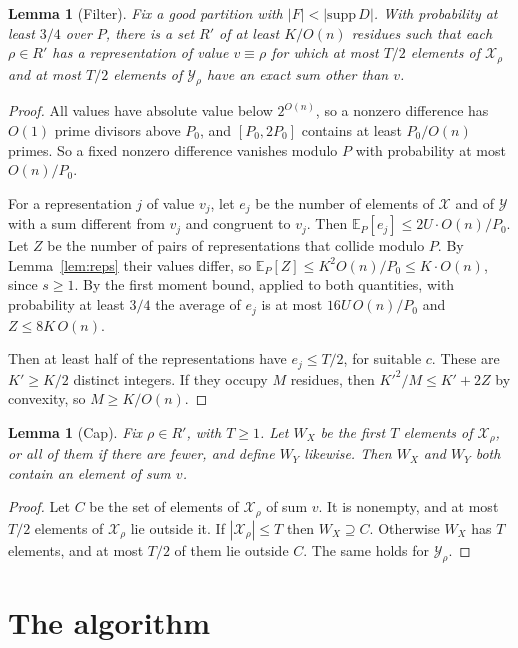 \documentclass[11pt]{article}
\newtheorem{lemma}[theorem]{Lemma}
\theoremstyle{remark}
\newcommand{\Xs}{\mathcal X}
\newcommand{\Ys}{\mathcal Y}
\begin{document}
\begin{lemma}[Filter]\label{lem:filter}
Fix a good partition with $|F|<|\mathrm{supp}\,D|$. With probability at least $3/4$ over $P$, there is a set $R'$ of at least $K/O(n)$ residues such that each $\rho\in R'$ has a representation of value $v\equiv\rho$ for which at most $T/2$ elements of $\Xs_\rho$ and at most $T/2$ elements of $\Ys_\rho$ have an exact sum other than $v$.
\end{lemma}
\begin{proof}
All values have absolute value below $2^{O(n)}$, so a nonzero difference has $O(1)$ prime divisors above $P_0$, and $[P_0,2P_0]$ contains at least $P_0/O(n)$ primes. So a fixed nonzero difference vanishes modulo $P$ with probability at most $O(n)/P_0$.

For a representation $j$ of value $v_j$, let $e_j$ be the number of elements of $\Xs$ and of $\Ys$ with a sum different from $v_j$ and congruent to $v_j$. Then $\mathbb E_P[e_j]\le2U\cdot O(n)/P_0$. Let $Z$ be the number of pairs of representations that collide modulo $P$. By Lemma~\ref{lem:reps} their values differ, so $\mathbb E_P[Z]\le K^2O(n)/P_0\le K\cdot O(n)$, since $s\ge1$. By the first moment bound, applied to both quantities, with probability at least $3/4$ the average of $e_j$ is at most $16U\,O(n)/P_0$ and $Z\le8K\,O(n)$.

Then at least half of the representations have $e_j\le T/2$, for suitable $c$. These are $K'\ge K/2$ distinct integers. If they occupy $M$ residues, then $K'^2/M\le K'+2Z$ by convexity, so $M\ge K/O(n)$.
\end{proof}

\begin{lemma}[Cap]\label{lem:cap}
Fix $\rho\in R'$, with $T\ge1$. Let $W_X$ be the first $T$ elements of $\Xs_\rho$, or all of them if there are fewer, and define $W_Y$ likewise. Then $W_X$ and $W_Y$ both contain an element of sum $v$.
\end{lemma}
\begin{proof}
Let $C$ be the set of elements of $\Xs_\rho$ of sum $v$. It is nonempty, and at most $T/2$ elements of $\Xs_\rho$ lie outside it. If $|\Xs_\rho|\le T$ then $W_X\supseteq C$. Otherwise $W_X$ has $T$ elements, and at most $T/2$ of them lie outside $C$. The same holds for $\Ys_\rho$.
\end{proof}

\section{The algorithm}\label{sec:alg}
\end{document}
